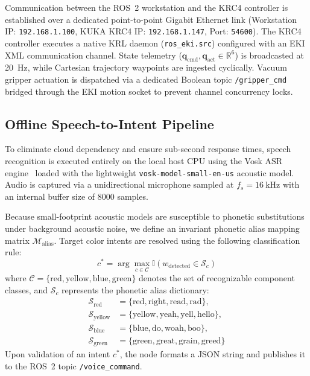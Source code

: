 \documentclass[runningheads]{llncs}
\begin{document}
Communication between the ROS~2 workstation and the KRC4 controller is established over a dedicated point-to-point Gigabit Ethernet link (Workstation IP: \texttt{192.168.1.100}, KUKA KRC4 IP: \texttt{192.168.1.147}, Port: \texttt{54600}). The KRC4 controller executes a native KRL daemon (\texttt{ros\_eki.src}) configured with an EKI XML communication channel. State telemetry ($\mathbf{q}_{\text{cmd}}, \mathbf{q}_{\text{act}} \in \mathbb{R}^6$) is broadcasted at \SI{20}{\hertz}, while Cartesian trajectory waypoints are ingested cyclically. Vacuum gripper actuation is dispatched via a dedicated Boolean topic \texttt{/gripper\_cmd} bridged through the EKI motion socket to prevent channel concurrency locks.

\subsection{Offline Speech-to-Intent Pipeline}
To eliminate cloud dependency and ensure sub-second response times, speech recognition is executed entirely on the local host CPU using the Vosk ASR engine~\cite{vosk2020} loaded with the lightweight \texttt{vosk-model-small-en-us} acoustic model. Audio is captured via a unidirectional microphone sampled at $f_s = \SI{16}{\kilo\hertz}$ with an internal buffer size of 8000 samples.

Because small-footprint acoustic models are susceptible to phonetic substitutions under background acoustic noise, we define an invariant phonetic alias mapping matrix $\mathcal{M}_{\text{alias}}$. Target color intents are resolved using the following classification rule:
\begin{equation}
    c^* = \arg\max_{c \in \mathcal{C}} \mathbb{I}\left( w_{\text{detected}} \in \mathcal{S}_c \right)
\end{equation}
where $\mathcal{C} = \{\text{red}, \text{yellow}, \text{blue}, \text{green}\}$ denotes the set of recognizable component classes, and $\mathcal{S}_c$ represents the phonetic alias dictionary:
\begin{align}
    \mathcal{S}_{\text{red}}    &= \{\text{red}, \text{right}, \text{read}, \text{rad}\}, \\
    \mathcal{S}_{\text{yellow}} &= \{\text{yellow}, \text{yeah}, \text{yell}, \text{hello}\}, \\
    \mathcal{S}_{\text{blue}}   &= \{\text{blue}, \text{do}, \text{woah}, \text{boo}\}, \\
    \mathcal{S}_{\text{green}}  &= \{\text{green}, \text{great}, \text{grain}, \text{greed}\}
\end{align}
Upon validation of an intent $c^*$, the node formats a JSON string and publishes it to the ROS~2 topic \texttt{/voice\_command}.
\end{document}
